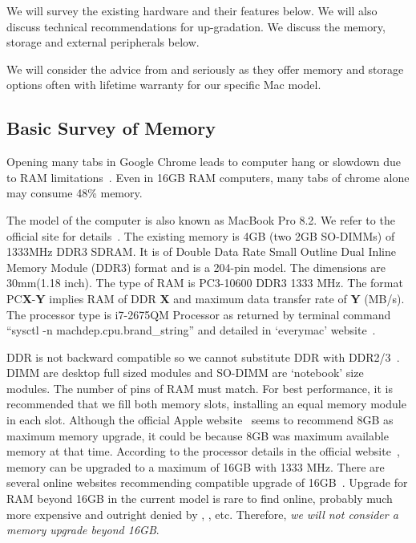 We will survey the existing hardware and their features below. We will also discuss technical recommendations for up-gradation. We discuss the memory, storage and external peripherals below.

We will consider the advice from \crucial and \macsales seriously as they offer memory and storage options often with lifetime warranty for our specific Mac model.

\subsection{Basic Survey of  Memory}

Opening many tabs in Google Chrome leads to computer hang or slowdown due to RAM limitations~\cite{suchromeram}. Even in 16GB RAM computers, many tabs of chrome alone may consume 48\% memory.

The model of the computer is \model also known as MacBook Pro 8.2.
We refer to the official site for details~\cite{modelupgradeapple}. The existing memory is 4GB (two 2GB SO-DIMMs) of 1333MHz DDR3 SDRAM. It is of Double Data Rate Small Outline Dual Inline Memory Module (DDR3) format and is a 204-pin model. The dimensions are 30mm(1.18 inch). The type of RAM is PC3-10600 DDR3 1333 MHz. The format PC\textbf{X}-\textbf{Y} implies RAM of DDR \textbf{X} and maximum data transfer rate of \textbf{Y} (MB/s). The processor type is \intel \core   i7-2675QM Processor as returned by terminal command ``sysctl -n machdep.cpu.brand\_string'' and detailed in `everymac' website~\cite{everymacdet}.

DDR is not backward compatible so we cannot substitute DDR with DDR2/3~\cite{macrumorbuyram}. 
DIMM are desktop full sized modules and SO-DIMM are `notebook' size modules. The number of pins of RAM must match.
For best performance, it is recommended that  we fill both memory slots, installing an equal memory module in each slot.
Although the official Apple website~\cite{modelupgradeapple} seems to recommend 8GB as maximum memory upgrade, it could be because 8GB was maximum available memory at that time. According to the processor details in the official \intel website~\cite{intelprodet}, memory can be upgraded to a maximum of 16GB with 1333 MHz. There are several online websites recommending compatible upgrade of 16GB~\cite{cnet16gb,everymacramupgrade,macsalesramlist,applestackexramup}. Upgrade for RAM beyond 16GB in the current model is rare to find online, probably much more expensive and outright denied by \intel, \macsales, etc. Therefore, \emph{we will not consider a memory upgrade beyond 16GB}.

